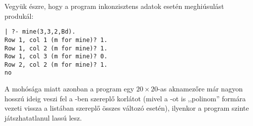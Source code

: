 Vegyük észre, hogy a program inkonzisztens adatok esetén meghiúsulást produkál:

\begin{verbatim}
| ?- mine(3,3,2,Bd).
Row 1, col 1 (m for mine)? 1.
Row 1, col 2 (m for mine)? 1.
Row 1, col 3 (m for mine)? 0.
Row 2, col 2 (m for mine)? 1.
no
\end{verbatim}

A \clpb mohósága miatt azonban a program egy $20 \times 20$-as aknamezőre már
nagyon hosszú ideig veszi fel a -ben szereplő 
korlátot (mivel a -ot is ,,polinom'' formára vezeti vissza a listában
szereplő összes változó esetén), ilyenkor a program szinte játszhatatlanul lassú lesz.